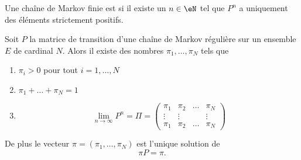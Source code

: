 \begin{definition}
    Une chaîne de Markov finie est  si il existe un \( n\in \eN\) tel que \( P^n\) a uniquement des éléments strictement positifs.
\end{definition}

\begin{theorem}
    Soit \( P\) la matrice de transition d'une chaîne de Markov régulière sur un ensemble \( E\) de cardinal \( N\). Alors il existe des nombres \( \pi_1,\ldots, \pi_N\) tels que
    \begin{enumerate}
        \item
            \( \pi_i>0\) pour tout \( i=1,\ldots, N\)
        \item
            \( \pi_1+\ldots +\pi_N=1\)
        \item
            \begin{equation}
                \lim_{n\to \infty} P^n=\Pi=\begin{pmatrix}
                     \pi_1   &   \pi_2    &   \ldots    &   \pi_N    \\
                     \vdots   &   \vdots    &       &   \vdots    \\ 
                     \pi_1   &   \pi_2    &   \ldots    &   \pi_N
                 \end{pmatrix}
            \end{equation}
    \end{enumerate}
    De plus le vecteur \( \pi=(\pi_1,\ldots, \pi_N)\) est l'unique solution de 
    \begin{equation}
        \pi P=\pi.
    \end{equation}
\end{theorem}

